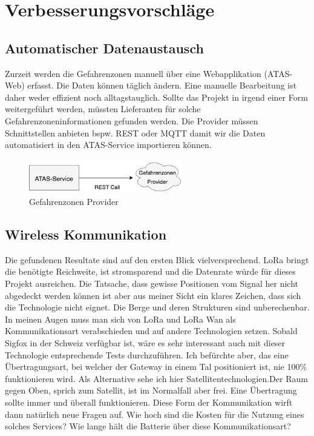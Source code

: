 \documentclass[11pt,english,german]{report}
\theoremstyle{definition}
\begin{document}
\section{Verbesserungsvorschläge}
\subsection{Automatischer Datenaustausch}
Zurzeit werden die Gefahrenzonen manuell über eine Webapplikation (ATAS-Web) erfasst. Die Daten können täglich ändern. Eine manuelle Bearbeitung ist daher weder effizient noch alltagstauglich. Sollte das Projekt in irgend einer Form weitergeführt werden, müssten Lieferanten für solche Gefahrenzoneninformationen gefunden werden. Die  Provider müssen Schnittstellen anbieten bspw. REST oder MQTT damit wir die Daten automatisiert in den ATAS-Service importieren können. 

\begin{figure}[H]
	\centering
	\includegraphics[width=0.6\textwidth]{img/system/ATAS_ExternalAccess.jpg}
	\caption[Gefahrenzonen Provider]
	{Gefahrenzonen Provider}
\end{figure}

\subsection{Wireless Kommunikation}
Die gefundenen Resultate sind auf den ersten Blick vielversprechend. LoRa bringt die benötigte Reichweite, ist stromsparend und die Datenrate würde für dieses Projekt ausreichen. Die Tatsache, dass gewisse Positionen vom Signal her nicht abgedeckt werden können ist aber aus meiner Sicht ein klares Zeichen, dass sich die Technologie nicht eignet. Die Berge und deren Strukturen sind unberechenbar.
\\[0.3cm]
In meinen Augen muss man sich von LoRa und LoRa Wan als Kommunikationsart verabschieden und auf andere Technologien setzen. Sobald Sigfox in der Schweiz verfügbar ist, wäre es sehr interessant auch mit dieser Technologie entsprechende Tests durchzuführen. Ich befürchte aber, das eine Übertragungsart, bei welcher der Gateway in einem Tal positioniert ist, nie 100\% funktionieren wird. Als Alternative sehe ich hier Satellitentechnologien.Der Raum gegen Oben, sprich zum Satellit, ist im Normalfall aber frei. Eine Übertragung sollte immer und überall funktionieren. Diese Form der Kommunikation wirft dann natürlich neue Fragen auf. Wie hoch sind die Kosten für die Nutzung eines solches Services? Wie lange hält die Batterie über diese Kommunikationsart?
\end{document}
